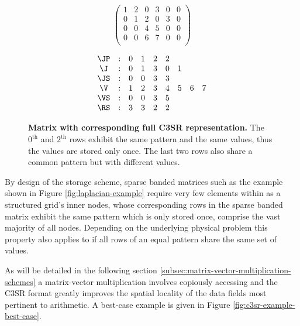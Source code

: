     \begin{figure}[ht]
      \centering
      \begin{minipage}{0.4\textwidth}
        \centering
        $$
        \begin{pmatrix}
          1 & 2 & 0 & 3 & 0 & 0 \\
          0 & 1 & 2 & 0 & 3 & 0 \\
          0 & 0 & 4 & 5 & 0 & 0 \\
          0 & 0 & 6 & 7 & 0 & 0 \\
        \end{pmatrix}
        $$
      \end{minipage}
      \begin{minipage}{0.4\textwidth}
        \centering
        $$
        \begin{matrix}
          \JP & : & 0 & 1 & 2 & 2 &   &   &   \\
           \J & : & 0 & 1 & 3 & 0 & 1 &   &   \\
          \JS & : & 0 & 0 & 3 & 3 &   &   &   \\
           \V & : & 1 & 2 & 3 & 4 & 5 & 6 & 7 \\
          \VS & : & 0 & 0 & 3 & 5 &   &   &   \\
          \RS & : & 3 & 3 & 2 & 2 &   &   &   \\
        \end{matrix}
        $$
      \end{minipage}
      \caption[Matrix with corresponding full C3SR representation.]{\textbf{Matrix with corresponding full C3SR representation.} The $0^{\text{th}}$ and $2^{\text{th}}$ rows exhibit the same pattern and the same values, thus the values are stored only once. The last two rows also share a common pattern but with different values.}
      \label{fig:c3sr_example_full}
    \end{figure}

    By design of the storage scheme, sparse banded matrices such as the example shown in Figure \ref{fig:laplacian-example} require very few elements within \J as a structured grid's inner nodes, whose corresponding rows in the sparse banded matrix exhibit the same pattern which is only stored once, comprise the vast majority of all nodes. Depending on the underlying physical problem this property also applies to \V if all rows of an equal pattern share the same set of values. 

    As will be detailed in the following section \ref{subsec:matrix-vector-multiplication-schemes} a matrix-vector multiplication involves copiously accessing \J and \V the C3SR format greatly improves the spatial locality of the data fields most pertinent to arithmetic. A best-case example is given in Figure \ref{fig:c3sr-example-best-case}.

